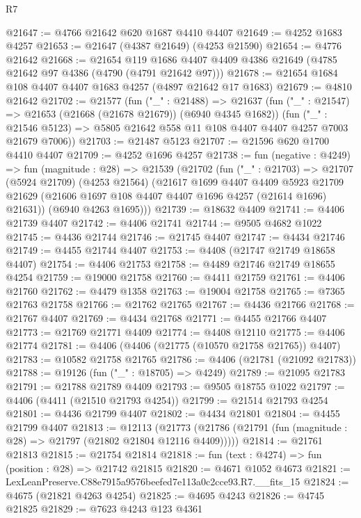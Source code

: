 \begin{lexlean}{R7}
\begin{coremodule}
@21647 := @4766 @21642 @620 @1687 @4410 @4407
@21649 := @4252 @1683 @4257
@21653 := @21647 (@4387 @21649) (@4253 @21590)
@21654 := @4776 @21642
@21668 := @21654
    @119
    @1686
    @4407
    @4409
    @4386
    @21649
    (@4785 @21642 @97 @4386 (@4790 (@4791 @21642 @97)))
@21678 := @21654 @1684 @108 @4407 @4407 @1683 @4257 (@4897 @21642 @17 @1683)
@21679 := @4810 @21642
@21702 := @21577
    (fun ("_" : @21488) =>
    @21637
      (fun ("_" : @21547) => @21653 (@21668 (@21678 @21679)) (@6940 @4345 @1682))
      (fun ("_" : @21546 @5123) => @5805 @21642 @558 @11 @108 @4407 @4407 @4257 @7003 @21679 @7006))
@21703 := @21487 @5123
@21707 := @21596 @620 @1700 @4410 @4407
@21709 := @4252 @1696 @4257
@21738 := fun (negative : @4249) =>
  fun (magnitude : @28) =>
  @21539
    (@21702
      (fun ("_" : @21703) =>
      @21707
        (@5924 @21709)
        (@4253 @21564)
        (@21617
          @1699
          @4407
          @4409
          @5923
          @21709
          @21629
          (@21606 @1697 @108 @4407 @4407 @1696 @4257 (@21614 @1696) @21631))
        (@6940 @4263 @1695)))
@21739 := @18632 @4409
@21741 := @4406 @21739 @4407
@21742 := @4406 @21741
@21744 := @9505 @4682 @1022
@21745 := @4436 @21744
@21746 := @21745 @4407
@21747 := @4434 @21746
@21749 := @4455 @21744 @4407
@21753 := @4408 (@21747 @21749 @18658 @4407)
@21754 := @4406 @21753
@21758 := @4489 @21746 @21749 @18655 @4254
@21759 := @19000 @21758
@21760 := @4411 @21759
@21761 := @4406 @21760
@21762 := @4479 @1358
@21763 := @19004 @21758
@21765 := @7365 @21763 @21758
@21766 := @21762 @21765
@21767 := @4436 @21766
@21768 := @21767 @4407
@21769 := @4434 @21768
@21771 := @4455 @21766 @4407
@21773 := @21769 @21771 @4409
@21774 := @4408 @12110
@21775 := @4406 @21774
@21781 := @4406 (@4406 (@21775 (@10570 @21758 @21765)) @4407)
@21783 := @10582 @21758 @21765
@21786 := @4406 (@21781 (@21092 @21783))
@21788 := @19126 (fun ("_" : @18705) => @4249)
@21789 := @21095 @21783
@21791 := @21788 @21789 @4409
@21793 := @9505 @18755 @1022
@21797 := @4406 (@4411 (@21510 @21793 @4254))
@21799 := @21514 @21793 @4254
@21801 := @4436 @21799 @4407
@21802 := @4434 @21801
@21804 := @4455 @21799 @4407
@21813 := @12113
    (@21773 (@21786 (@21791 (fun (magnitude : @28) => @21797 (@21802 @21804 @12116 @4409)))))
@21814 := @21761 @21813
@21815 := @21754 @21814
@21818 := fun (text : @4274) => fun (position : @28) => @21742 @21815
@21820 := @4671 @1052 @4673
@21821 := LexLeanPreserve.C88e7915a9576beefed7e113a0c2cce93.R7.__fits_15
@21824 := @4675 (@21821 @4263 @4254)
@21825 := @4695 @4243
@21826 := @4745 @21825
@21829 := @7623 @4243 @123 @4361

\end{coremodule}
\end{lexlean}
